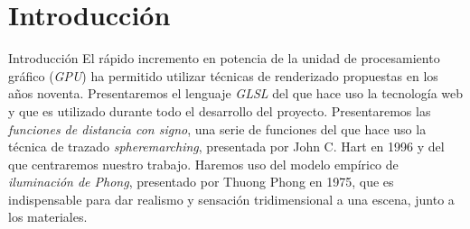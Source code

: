 \section{Introducción}

\begin{frame}{Introducción}
    El rápido incremento en potencia de la unidad de procesamiento gráfico (\textit{GPU}) ha permitido utilizar técnicas de renderizado propuestas en los años noventa. Presentaremos el lenguaje \textit{GLSL} del que hace uso la tecnología web y que es utilizado durante todo el desarrollo del proyecto.\vfill
    Presentaremos las \textit{funciones de distancia con signo}, una serie de funciones del que hace uso la técnica de trazado \textit{spheremarching}, presentada por John C. Hart en 1996 y del que centraremos nuestro trabajo.\vfill
    Haremos uso del modelo empírico de \textit{iluminación de Phong}, presentado por Thuong Phong en 1975, que es indispensable para dar realismo y sensación tridimensional a una escena, junto a los materiales.
\end{frame}